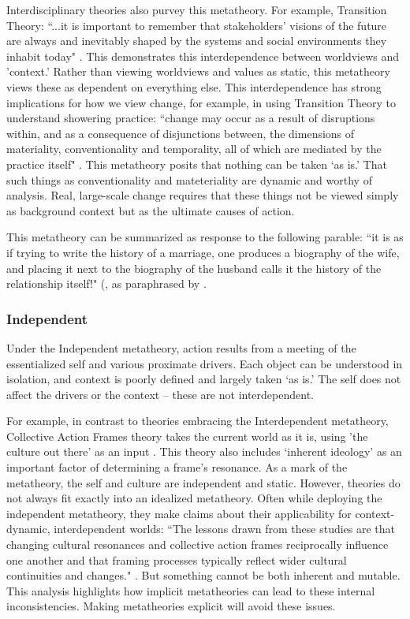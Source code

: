 \documentclass[12 pt]{article}
\begin{document}
		Interdisciplinary theories also purvey this metatheory. For example, Transition Theory: ``...it
		is important to remember that stakeholders' visions of the future are always and
		inevitably shaped by the systems and social environments they inhabit today" \parencite[][p. 765]{Shove2007}. This  demonstrates this interdependence between worldviews and 'context.' Rather than viewing worldviews and values as static, this metatheory views these as dependent on everything else. This interdependence has strong implications for how we view change, for example, in using Transition Theory to understand showering practice: ``change may occur as a result of disruptions within, and as a consequence of disjunctions between, the dimensions of materiality, conventionality and temporality, all of which are mediated by the practice itself" \parencite[][unpaginated]{Hand2005}. This metatheory posits that nothing can be taken  `as is.' That such things as conventionality and mateteriality are dynamic and worthy of analysis. Real, large-scale change requires that these things not be viewed simply as background context but as the ultimate causes of action. 
		
		This metatheory can be summarized as  response to the following parable:  ``it is as if trying to write the history of a marriage,
		one produces a biography of the wife, and placing it next to the biography
		of the husband calls it the history of the relationship itself!" (\textcite{White1995}, as paraphrased by \textcite[][p. 204]{Agrawal2005}. 
		
	
	\subsubsection{Independent}
	Under the Independent metatheory, action results from a meeting of the essentialized self and various proximate drivers. Each object can be understood in isolation, and context is poorly defined and  largely taken `as is.' The self does not affect the drivers or the context -- these are not interdependent. 

	
	For example, in contrast to theories embracing the Interdependent metatheory, Collective Action Frames theory takes the current world as it is, using 'the culture out there' as an input \parencite{Benford2000}. This theory also includes `inherent ideology' as an important factor of determining a frame's resonance. As a mark of the metatheory, the self and culture are independent and static. However, theories do not always fit exactly into an idealized metatheory. Often while deploying the independent metatheory, they make claims about their applicability for context-dynamic, interdependent worlds:  ``The lessons drawn from these studies are that changing cultural resonances and collective action frames reciprocally influence one another and that framing processes typically reflect wider cultural continuities and changes." \parencite[][p. 629]{Benford2000}. But something cannot be both inherent and mutable. This analysis highlights how implicit metatheories can lead to these internal inconsistencies. Making metatheories explicit will avoid these issues. 
	
\end{document}
